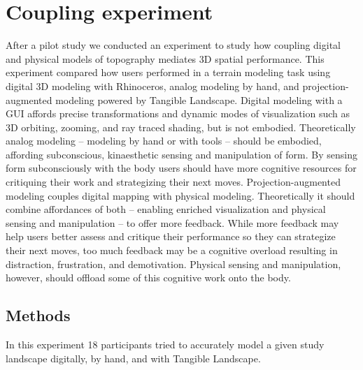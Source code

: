 \documentclass[prodmode,acmtochi]{acmsmall} %
\begin{document}
\section{Coupling experiment}
After a pilot study \cite{Harmon2016b}
we conducted an experiment to study how 
coupling digital and physical models of topography 
mediates 3D spatial performance. 
%
This experiment compared how users performed 
in a terrain modeling task using 
digital 3D modeling with Rhinoceros, 
analog modeling by hand, 
and projection-augmented modeling powered by Tangible Landscape. 
Digital modeling with a GUI affords precise transformations and
dynamic modes of visualization such as 
3D orbiting, zooming, and ray traced shading,
but is not embodied.
Theoretically analog modeling -- modeling by hand or with tools -- 
should be embodied, 
affording subconscious, kinaesthetic sensing and manipulation of form. 
By sensing form subconsciously with the body
users should have more cognitive resources for critiquing their work 
and strategizing their next moves. 
% 
Projection-augmented modeling 
couples digital mapping with physical modeling.
Theoretically it should combine affordances of both -- 
enabling enriched visualization and physical sensing and manipulation -- 
to offer more feedback.
While more feedback may help users 
better assess and critique their performance 
so they can strategize their next moves,
too much feedback may be a cognitive overload 
resulting in distraction, frustration, and demotivation. 
Physical sensing and manipulation, however, should offload 
some of this cognitive work onto the body.

\subsection{Methods}
In this experiment 
18 participants tried to accurately model a given study landscape 
digitally, by hand, and with Tangible Landscape. 

% 
% 

\end{document}
